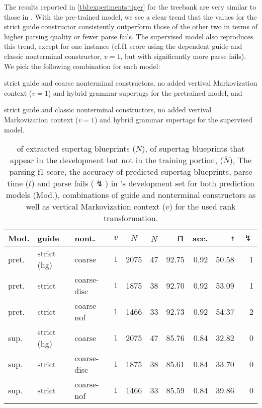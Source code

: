 \documentclass[../../document.tex]{subfiles}
\begin{document}
    The results reported in \cref{tbl:experiments:tiger} for the \tiger{} treebank are very similar to those in \negra{}.
    With the pre-trained model, we see a clear trend that the values for the strict guide constructor consistently outperform those of the other two in terms of higher parsing quality or fewer parse fails.
    The supervised model also reproduces this trend, except for one instance (cf.\@ f1 score using the dependent guide and classic nonterminal constructor, $v=1$, but with significantly more parse fails).
    We pick the following combination for each model:
    \begin{compactitem}
        \item strict guide and coarse nonterminal constructors, no added vertival Markovization context ($v=1$) and hybrid grammar supertags for the pretrained model, and
        \item strict guide and classic nonterminal constructors, no added vertival Markovization context ($v=1$) and hybrid grammar supertags for the supervised model.
    \end{compactitem}

    \begin{table}
        \caption{\label{tbl:experiments:tiger:dcp}
        of extracted supertag blueprints ($N$), of supertag blueprints that appear in the development but not in the training portion, ($\overline{N}$), The parsing f1 score, the accuracy of predicted  supertag blueprints, parse time ($t$) and parse fails ($\lightning$) in 's development set for both prediction models (Mod.), combinations of guide and nonterminal constructors as well as vertical Markovization context ($v$) for the used rank transformation.
        }
        \centering
        \setlength{\tabcolsep}{4pt}
        \vspace{.2cm}
        \begin{tabular}{lllc|cc|rrrr}
            \toprule
Mod. &  guide &   nont.   &\(v\)  & $N$ & $\overline{N}$  & f1 & acc. & $t$ & $\lightning$ \\ \hline \rowcolor{black!10}
pret. & strict (hg) &  coarse & \(1\)     & 2075 & 47 & 92.75 & 0.92 & 50.58 & 1  \\\hline
pret. & strict    &  coarse-disc & \(1\)  & 1875 & 38 & 92.70 & 0.92 & 53.09 & 1  \\
pret. & strict     &  coarse-nof & \(1\)  & 1466 & 33 & 92.73 & 0.92 & 54.37 & 2  \\
\midrule \rowcolor{black!10}
sup. & strict (hg) &  coarse & \(1\)     & 2075 & 47 & 85.76 & 0.84 & 32.82 & 0  \\\hline
sup. & strict    &  coarse-disc & \(1\)  & 1875 & 38 & 85.61 & 0.84 & 33.70 & 0  \\
sup. & strict     &  coarse-nof & \(1\)  & 1466 & 33 & 85.59 & 0.84 & 39.86 & 0  \\
    \bottomrule
        \end{tabular}
    \end{table}
\end{document}
